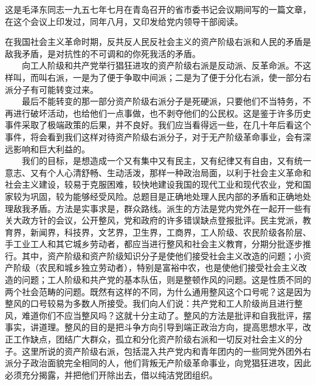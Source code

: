 \documentclass[cn,11pt,chinese]{elegantbook}
\begin{document}
\begin{introduction}\item 这是毛泽东同志一九五七年七月在青岛召开的省市委书记会议期间写的一篇文章，在这个会议上印发过，同年八月，又印发给党内领导干部阅读。\end{introduction}
在我国社会主义革命时期，反共反人民反社会主义的资产阶级右派和人民的矛盾是敌我矛盾，是对抗性的不可调和的你死我活的矛盾。\\
　　向工人阶级和共产党举行猖狂进攻的资产阶级右派是反动派、反革命派。不这样叫，而叫右派，一是为了便于争取中间派；二是为了便于分化右派，使一部分右派分子有可能转变过来。\\
　　最后不能转变的那一部分资产阶级右派分子是死硬派，只要他们不当特务，不再进行破坏活动，也给他们一点事做，也不剥夺他们的公民权。这是鉴于许多历史事件采取了极端政策的后果，并不良好。我们应当看得远一些，在几十年后看这个事件，将会看到我们这样对待资产阶级右派分子，对于无产阶级革命事业，会有深远影响和巨大利益的。\\
　　我们的目标，是想造成一个又有集中又有民主，又有纪律又有自由，又有统一意志、又有个人心清舒畅、生动活泼，那样一种政治局面，以利于社会主义革命和社会主义建设，较易于克服困难，较快地建设我国的现代工业和现代农业，党和国家较为巩固，较为能够经受风险。总题目是正确地处理人民内部的矛盾和正确地处理敌我矛盾。方法是实事求是，群众路线。派生的方法是党内党外在一起开一些有关大政方针的会议，公开整风，党和政府的许多错误缺点登报批评。民主党派，教育界，新闻界，科技界，文艺界，卫生界，工商界，工人阶级、农民阶级各阶层、手工业工人和其它城乡劳动者，都应当进行整风和社会主义教育，分期分批逐步推行。其中，资产阶级和资产阶级知识分子是使他们接受社会主义改造的问题；小资产阶级（农民和城乡独立劳动者），特别是富裕中农，也是使他们接受社会主义改造的问题；工人阶级和共产党的基本队伍，则是整顿作风的问题。这是性质不同的两个社会范畴的问题。既然有这样的不同，为什么通用整风这个口号呢？这是因为整风的口号较易为多数人所接受。我们向人们说：共产党和工人阶级尚且进行整风，难道你们不应当整风吗？这就十分主动了。整风的方法是批评和自我批评，摆事实，讲道理。整风的目的是把斗争方向引导到端正政治方向，提高思想水平，改正工作缺点，团结广大群众，孤立和分化资产阶级右派和一切反对社会主义的分子。这里所说的资产阶级右派，包括混入共产党内和青年团内的一些同党外团外右派分子政治面貌完全相同的人，他们背叛无产阶级革命事业，向党猖狂进攻，因此必须充分揭露，并把他们开除出去，借以纯洁党团组织。\\
\end{document}

